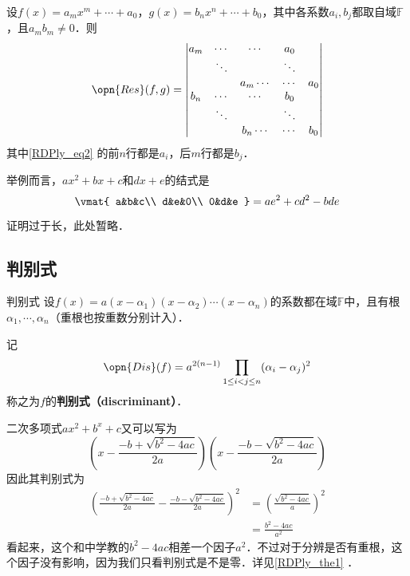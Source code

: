 \begin{theorem}{}\label{RDPly_the2}
设$f(x)=a_mx^m+\cdots+a_0$，$g(x)=b_nx^n+\cdots+b_0$，其中各系数$a_i, b_j$都取自域$\mathbb{F}$，且$a_mb_m\neq 0$．则
\begin{equation}\label{RDPly_eq2}
\opn{Res}(f, g)=
\begin{vmatrix}
a_m&\cdots&\cdots&a_0\\
&\ddots& & \ddots\\
&&a_m\cdots&\cdots&a_0\\
b_n&\cdots&\cdots&b_0\\
&\ddots& & \ddots\\
&&b_n\cdots&\cdots&b_0\\
\end{vmatrix}
\end{equation}
其中\autoref{RDPly_eq2} 的前$n$行都是$a_i$，后$m$行都是$b_j$．

举例而言，$ax^2+bx+c$和$dx+e$的结式是
\begin{equation}
\vmat{
    a&b&c\\
    d&e&0\\
    0&d&e
}
=
ae^2+cd^2-bde
\end{equation}

\end{theorem}

证明过于长，此处暂略．



\subsection{判别式}

\begin{definition}{判别式}
设$f(x)=a(x-\alpha_1)(x-\alpha_2)\cdots(x-\alpha_n)$的系数都在域$\mathbb{F}$中，且有根$\alpha_1, \cdots, \alpha_n$（重根也按重数分别计入）．

记
\begin{equation}\label{RDPly_eq3}
\opn{Dis}(f) = a^{2(n-1)}\prod_{1\leq i<j\leq n}(\alpha_i-\alpha_j)^2
\end{equation}
称之为$f$的\textbf{判别式（discriminant）}．
\end{definition}

\begin{example}{}
二次多项式$ax^2+b^x+c$又可以写为
\begin{equation}
(x-\frac{-b+\sqrt{b^2-4ac}}{2a})(x-\frac{-b-\sqrt{b^2-4ac}}{2a})
\end{equation}
因此其判别式为
\begin{equation}
\begin{aligned}
(\frac{-b+\sqrt{b^2-4ac}}{2a}-\frac{-b-\sqrt{b^2-4ac}}{2a})^2 &= (\frac{\sqrt{b^2-4ac}}{a})^2\\
&=\frac{b^2-4ac}{a^2}
\end{aligned}
\end{equation}
看起来，这个和中学教的$b^2-4ac$相差一个因子$a^2$．不过对于分辨是否有重根，这个因子没有影响，因为我们只看判别式是不是零．详见\autoref{RDPly_the1} ．
\end{example}


